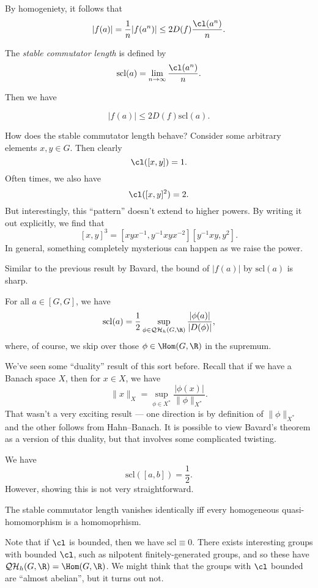 \documentclass[a4paper]{article}
\newcommand\QH{\mathcal{QH}}
\newcommand\scl{\mathrm{scl}}
\begin{document}
By homogeniety, it follows that
\[
  |f(a)| = \frac{1}{n} |f(a^n)| \leq 2 D(f) \frac{\cl(a^n)}{n}.
\]

\begin{defi}
  The \emph{stable commutator length} is defined by
  \[
    \scl(a) = \lim_{n \to \infty} \frac{\cl(a^n)}{n}.
  \]
\end{defi}

Then we have
\begin{prop}
  \[
    |f(a)| \leq 2 D(f) \scl(a).
  \]
\end{prop}

How does the stable commutator length behave? Consider some arbitrary elements $x, y \in G$. Then clearly
\[
  \cl([x, y]) = 1.
\]
Often times, we also have
\[
  \cl([x, y]^2) = 2.
\]
But interestingly, this ``pattern'' doesn't extend to higher powers. By writing it out explicitly, we find that
\[
  [x, y]^3 = [xyx^{-1}, y^{-1} xyx^{-2}] [y^{-1}xy, y^2].
\]
In general, something completely mysterious can happen as we raise the power.

Similar to the previous result by Bavard, the bound of $|f(a)|$ by $\scl(a)$ is sharp.
\begin{thm}[Bavard, 1992]
  For all $a \in [G, G]$, we have
  \[
    \scl(a) = \frac{1}{2} \sup_{\phi \in \QH_h(G, \R)} \frac{|\phi(a)|}{|D(\phi)|},
  \]
  where, of course, we skip over those $\phi \in \Hom(G, \R)$ in the supremum.
\end{thm}
We've seen some ``duality'' result of this sort before. Recall that if we have a Banach space $X$, then for $x \in X$, we have
\[
  \|x\|_X = \sup_{\phi \in X^*} \frac{|\phi(x)|}{\|\phi\|_{X^*}}.
\]
That wasn't a very exciting result --- one direction is by definition of $\|\phi\|_{X^*}$ and the other follows from Hahn--Banach. It is possible to view Bavard's theorem as a version of this duality, but that involves some complicated twisting.

\begin{eg}
  We have
  \[
    \scl([a, b]) = \frac{1}{2}.
  \]
  However, showing this is not very straightforward.
\end{eg}

\begin{cor}
  The stable commutator length vanishes identically iff every homogeneous quasi-homomorphism is a homomoprhism.
\end{cor}

Note that if $\cl$ is bounded, then we have $\scl \equiv 0$. There exists interesting groups with bounded $\cl$, such as nilpotent finitely-generated groups, and so these have $\QH_h(G, \R) = \Hom(G, \R)$. We might think that the groups with $\cl$ bounded are ``almost abelian'', but it turns out not.
\end{document}
